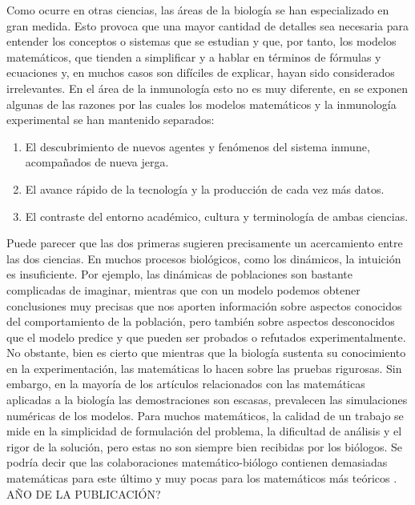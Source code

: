 Como ocurre en otras ciencias, las áreas de la biología se han especializado en gran medida. Esto provoca que una mayor cantidad de detalles sea necesaria para entender los conceptos o sistemas que se estudian y que, por tanto, los modelos matemáticos, que tienden a simplificar y a hablar en términos de fórmulas y ecuaciones y, en muchos casos son difíciles de explicar, hayan sido considerados irrelevantes. En el área de la inmunología esto no es muy diferente, en \cite{mathsModInmu} se exponen algunas de las razones por las cuales los modelos matemáticos y la inmunología experimental se han mantenido separados:

\begin{enumerate}
	\item El descubrimiento de nuevos agentes y fenómenos del sistema inmune, acompañados de nueva jerga.
	
	\item El avance rápido de la tecnología y la producción de cada vez más datos.
	
	\item El contraste del entorno académico, cultura y terminología de ambas ciencias.
\end{enumerate}

Puede parecer que las dos primeras sugieren precisamente un acercamiento entre las dos ciencias. En muchos procesos biológicos, como los dinámicos, la intuición es insuficiente. Por ejemplo, las dinámicas de poblaciones son bastante complicadas de imaginar, mientras que con un modelo podemos obtener conclusiones muy precisas que nos aporten información sobre aspectos conocidos del comportamiento de la población, pero también sobre aspectos desconocidos que el modelo predice y que pueden ser probados o refutados experimentalmente. No obstante, bien es cierto que mientras que la biología sustenta su conocimiento en la experimentación, las matemáticas lo hacen sobre las pruebas rigurosas. Sin embargo, en la mayoría de los artículos relacionados con las matemáticas aplicadas a la biología las demostraciones son escasas, prevalecen las simulaciones numéricas de los modelos. Para muchos matemáticos, la calidad de un trabajo se mide en la simplicidad de formulación del problema, la dificultad de análisis y el rigor de la solución, pero estas no son siempre bien recibidas por los biólogos. Se podría decir que las colaboraciones matemático-biólogo contienen demasiadas matemáticas para este último y muy pocas para los matemáticos más teóricos \citep{RoleOfM}. AÑO DE LA PUBLICACIÓN?

